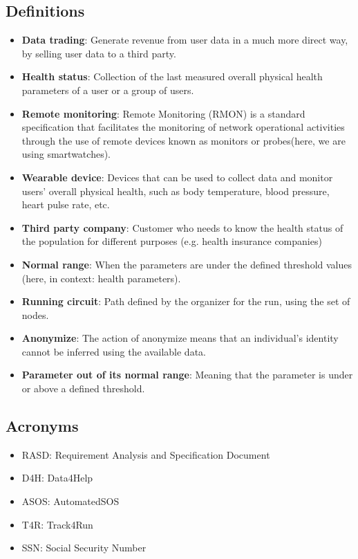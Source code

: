 \documentclass[a4paper, hidelinks, 12pt]{report}
\begin{document}
	\subsection{Definitions}
	\begin{itemize}
		\item{\textbf{Data trading}}: Generate revenue from user data in a much more direct way, by selling user data to a third party.
		\item{\textbf{Health status}}: Collection of the last measured overall physical health parameters of a user or a group of users.
		\item{\textbf{Remote monitoring}}: Remote Monitoring (RMON) is a standard specification that facilitates the monitoring of network operational activities through the use of remote devices known as monitors or probes(here, we are using smartwatches).
		\item{\textbf{Wearable device}}: Devices that can be used to collect data and monitor users' overall physical health, such as body temperature, blood pressure, heart pulse rate, etc.
		\item{\textbf{Third party company}}: Customer who needs to know the health status of the population for different purposes (e.g. health insurance companies)
		\item{\textbf{Normal range}}: When the parameters are under the defined threshold values (here, in context: health parameters).
		\item{\textbf{Running circuit}}: Path defined by the organizer for the run, using the set of nodes.
		\item{\textbf{Anonymize}}: The action of anonymize means that an individual's identity cannot be inferred using the available data.
		\item{\textbf{Parameter out of its normal range}}: Meaning that the parameter is under or above a defined threshold.
	\end{itemize}
	
	\subsection{Acronyms}
	\begin{itemize}
		\item{RASD}: Requirement Analysis and Specification Document
		\item{D4H}: Data4Help
		\item{ASOS}: AutomatedSOS
		\item{T4R}: Track4Run
		\item{SSN}: Social Security Number
	\end{itemize}
	
\end{document}
